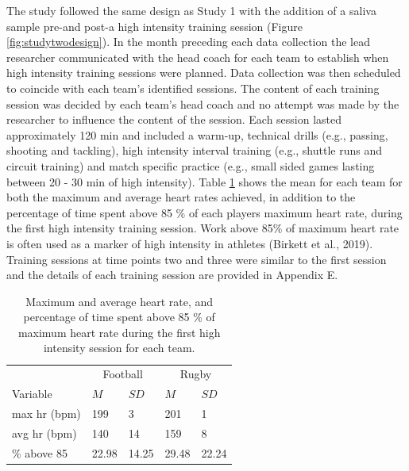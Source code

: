 \documentclass[
  english,
  man,floatsintext]{apa6}
\begin{document}
The study followed the same design as Study 1 with the addition of a saliva sample pre-and post-a high intensity training session (Figure \ref{fig:studytwodesign}).
In the month preceding each data collection the lead researcher communicated with the head coach for each team to establish when high intensity training sessions were planned.
Data collection was then scheduled to coincide with each team's identified sessions.
The content of each training session was decided by each team's head coach and no attempt was made by the researcher to influence the content of the session.
Each session lasted approximately 120 min and included a warm-up, technical drills (e.g., passing, shooting and tackling), high intensity interval training (e.g., shuttle runs and circuit training) and match specific practice (e.g., small sided games lasting between 20 - 30 min of high intensity).
Table \ref{tab:hrdata} shows the mean for each team for both the maximum and average heart rates achieved, in addition to the percentage of time spent above 85 \% of each players maximum heart rate, during the first high intensity training session.
Work above 85\% of maximum heart rate is often used as a marker of high intensity in athletes (Birkett et al., 2019).
Training sessions at time points two and three were similar to the first session and the details of each training session are provided in Appendix E.

\begin{table}[H]

\begin{center}
\begin{threeparttable}

\caption{\label{tab:hrdata}Maximum and average heart rate, and percentage of time spent above 85 \% of maximum heart rate during the first high intensity session for each team.}

\begin{tabular}{lllll}
\toprule
 & \multicolumn{2}{c}{Football} & \multicolumn{2}{c}{Rugby} \\
\cmidrule(r){2-3} \cmidrule(r){4-5}
Variable & $M$ & $SD$ & $M$ & $SD$\\
\midrule
max hr (bpm) & 199 & 3 & 201 & 1\\
avg hr (bpm) & 140 & 14 & 159 & 8\\
\% above 85 & 22.98 & 14.25 & 29.48 & 22.24\\
\bottomrule
\end{tabular}

\end{threeparttable}
\end{center}

\end{table}
\end{document}

